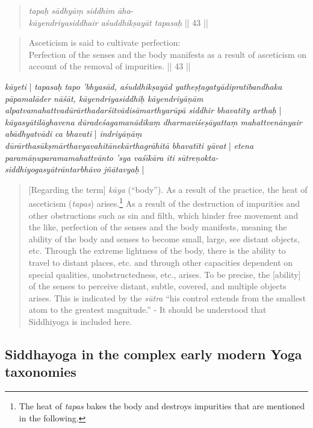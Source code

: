 \begin{quote}
\textit{tapaḥ sādhyāṃ siddhim āha}- \\
\textit{kāyendriyasiddhair aśuddhikṣayāt tapasaḥ} || 43 ||
\end{quote}
\begin{quote}
  Asceticism is said to cultivate perfection:\\
  Perfection of the senses and the body manifests as a result of asceticism on account of the removal of impurities. || 43 ||
\end{quote}
\textit{kāyeti} | \textit{tapasaḥ tapo 'bhyasād, aśuddhikṣayād yatheṣṭagatyādipratibandhaka pāpamalāder nāśāt, kāyendriyasiddhiḥ kāyendriyāṇām alpatvamahattvadūrārthadarśitvādisāmarthyarūpā siddhir bhavatīty arthaḥ} | \textit{kāyasyātilāghavena dūradeśagamanādikaṃ dharmaviśeṣāyattaṃ mahattvenānyair abādhyatvādi ca bhavati} | \textit{indriyāṇāṃ dūrārthasūkṣmārthavyavahitānekārthagrāhitā bhavatīti yāvat} | \textit{etena paramāṇuparamamahattvānto 'sya vaśīkāra iti sūtreṇokta- siddhiyogasyātrāntarbhāvo jñātavyaḥ} |
\begin{quote}
[Regarding the term] \textit{kāya} (``body''). As a result of the practice, the heat of asceticism (\textit{tapas}) arises.\footnote{The heat of \textit{tapas} bakes the body and destroys impurities that are mentioned in the following.} As a result of the destruction of impurities and other obstructions such as sin and filth, which hinder free movement and the like, perfection of the senses and the body manifests, meaning the ability of the body and senses to become small, large, see distant objects, etc. Through the extreme lightness of the body, there is the ability to travel to distant places, etc. and through other capacities dependent on special qualities, unobstructedness, etc., arises. To be precise, the [ability] of the senses to perceive distant, subtle, covered, and multiple objects arises. This is indicated by the \textit{sūtra} ``his control extends from the smallest atom to the greatest magnitude.'' - It should be understood that Siddhiyoga is included here. 
\end{quote}

\subsection{Siddhayoga in the complex early modern Yoga taxonomies}

